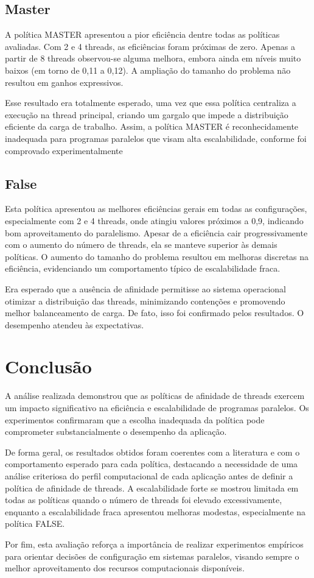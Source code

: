 \documentclass[a4paper, 12pt]{article}
\begin{document}
	\subsection{Master}
	A política MASTER apresentou a pior eficiência dentre todas as políticas avaliadas. Com 2 e 4 threads, as eficiências foram próximas de zero. Apenas a partir de 8 threads observou-se alguma melhora, embora ainda em níveis muito baixos (em torno de 0,11 a 0,12). A ampliação do tamanho do problema não resultou em ganhos expressivos.
	
	Esse resultado era totalmente esperado, uma vez que essa política centraliza a execução na thread principal, criando um gargalo que impede a distribuição eficiente da carga de trabalho. Assim, a política MASTER é reconhecidamente inadequada para programas paralelos que visam alta escalabilidade, conforme foi comprovado experimentalmente
	
	\subsection{False}
	Esta política apresentou as melhores eficiências gerais em todas as configurações, especialmente com 2 e 4 threads, onde atingiu valores próximos a 0,9, indicando bom aproveitamento do paralelismo. Apesar de a eficiência cair progressivamente com o aumento do número de threads, ela se manteve superior às demais políticas. O aumento do tamanho do problema resultou em melhoras discretas na eficiência, evidenciando um comportamento típico de escalabilidade fraca.
	
	Era esperado que a ausência de afinidade permitisse ao sistema operacional otimizar a distribuição das threads, minimizando contenções e promovendo melhor balanceamento de carga. De fato, isso foi confirmado pelos resultados. O desempenho atendeu às expectativas.
	
	\section{Conclusão}

	A análise realizada demonstrou que as políticas de afinidade de threads exercem um impacto significativo na eficiência e escalabilidade de programas paralelos. Os experimentos confirmaram que a escolha inadequada da política pode comprometer substancialmente o desempenho da aplicação.
	
	De forma geral, os resultados obtidos foram coerentes com a literatura e com o comportamento esperado para cada política, destacando a necessidade de uma análise criteriosa do perfil computacional de cada aplicação antes de definir a política de afinidade de threads. A escalabilidade forte se mostrou limitada em todas as políticas quando o número de threads foi elevado excessivamente, enquanto a escalabilidade fraca apresentou melhoras modestas, especialmente na política FALSE.
	
	Por fim, esta avaliação reforça a importância de realizar experimentos empíricos para orientar decisões de configuração em sistemas paralelos, visando sempre o melhor aproveitamento dos recursos computacionais disponíveis.
	
	

	 
\end{document}
